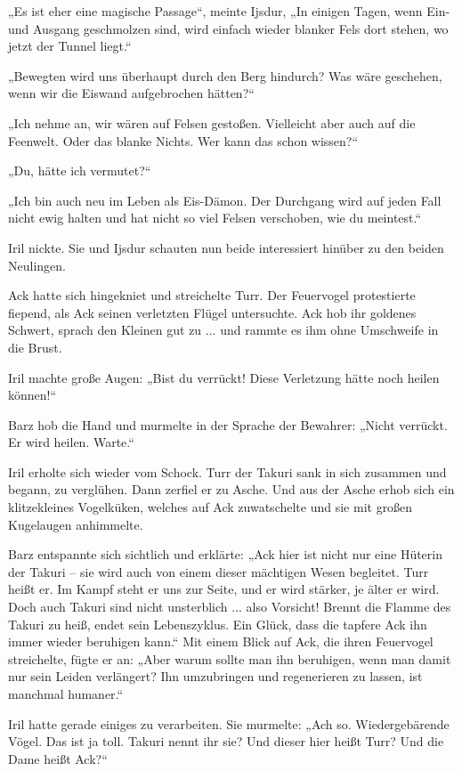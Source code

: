 „Es ist eher eine magische Passage“, meinte Ijsdur, „In einigen Tagen, wenn Ein- und Ausgang geschmolzen sind, wird einfach wieder blanker Fels dort stehen, wo jetzt der Tunnel liegt.“

„Bewegten wird uns überhaupt durch den Berg hindurch? Was wäre geschehen, wenn wir die Eiswand aufgebrochen hätten?“

„Ich nehme an, wir wären auf Felsen gestoßen. Vielleicht aber auch auf die Feenwelt. Oder das blanke Nichts. Wer kann das schon wissen?“

„Du, hätte ich vermutet?“

„Ich bin auch neu im Leben als Eis-Dämon. Der Durchgang wird auf jeden Fall nicht ewig halten und hat nicht so viel Felsen verschoben, wie du meintest.“

Iril nickte. Sie und Ijsdur schauten nun beide interessiert hinüber zu den beiden Neulingen.

Ack hatte sich hingekniet und streichelte Turr. Der Feuervogel protestierte fiepend, als Ack seinen verletzten Flügel untersuchte. Ack hob ihr goldenes Schwert, sprach den Kleinen gut zu ... und rammte es ihm ohne Umschweife in die Brust.

Iril machte große Augen: „Bist du verrückt! Diese Verletzung hätte noch heilen können!“

Barz hob die Hand und murmelte in der Sprache der Bewahrer: „Nicht verrückt. Er wird heilen. Warte.“

Iril erholte sich wieder vom Schock. Turr der Takuri sank in sich zusammen und begann, zu verglühen. Dann zerfiel er zu Asche. Und aus der Asche erhob sich ein klitzekleines Vogelküken, welches auf Ack zuwatschelte und sie mit großen Kugelaugen anhimmelte.

Barz entspannte sich sichtlich und erklärte: „Ack hier ist nicht nur eine Hüterin der Takuri – sie wird auch von einem dieser mächtigen Wesen begleitet. Turr heißt er. Im Kampf steht er uns zur Seite, und er wird stärker, je älter er wird. Doch auch Takuri sind nicht unsterblich ... also Vorsicht! Brennt die Flamme des Takuri zu heiß, endet sein Lebenszyklus. Ein Glück, dass die tapfere Ack ihn immer wieder beruhigen kann.“ Mit einem Blick auf Ack, die ihren Feuervogel streichelte, fügte er an: „Aber warum sollte man ihn beruhigen, wenn man damit nur sein Leiden verlängert? Ihn umzubringen und regenerieren zu lassen, ist manchmal humaner.“

Iril hatte gerade einiges zu verarbeiten. Sie murmelte: „Ach so. Wiedergebärende Vögel. Das ist ja toll. Takuri nennt ihr sie? Und dieser hier heißt Turr? Und die Dame heißt Ack?“

